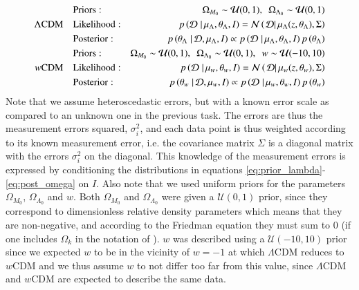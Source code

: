 \documentclass[11pt,a4paper]{article}
\begin{document}
\begin{align}
    \label{eq:prior_lambda}
    &\hspace{10px}                            \text{Priors}:  &\Omega_{M_0} \sim \mathcal{U}(0,1), \hspace{5px} \Omega_{\Lambda_0} \sim \mathcal{U}(0,1) \\
    \label{eq:like_lambda}
    \Lambda\text{CDM}&\hspace{10px}           \text{Likelihood}:  &p\left(\mathcal{D} \left. \right\vert \mu_{\Lambda}, \theta_{\Lambda}, I \right)  = \mathcal{N}\left( \left.\mathcal{D} \right\vert \mu_{\Lambda}(z, \theta_{\Lambda}), \Sigma\right)\\
    \label{eq:post_lambda}
    &\hspace{10px}                            \text{Posterior}: &p\left(\theta_{\Lambda} \left. \right\vert \mathcal{D}, \mu_{\Lambda}, I \right) \propto p\left(\mathcal{D} \left. \right\vert \mu_{\Lambda}, \theta_{\Lambda}, I \right) p\left(\theta_{\Lambda} \right)\\
    \label{eq:prior_omega}
    &\hspace{10px}                            \text{Priors}:  &\Omega_{M_0} \sim \mathcal{U}(0,1), \hspace{5px} \Omega_{\Lambda_0} \sim \mathcal{U}(0,1), \hspace{5px} w \sim \mathcal{U}(-10,10) \\
    \label{eq:like_omega}
    w\text{CDM}& \hspace{10px}                \text{Likelihood}:  &p\left(\mathcal{D} \left. \right\vert \mu_{w}, \theta_{w}, I \right)  = \mathcal{N}\left( \left.\mathcal{D} \right\vert \mu_{w}(z, \theta_{w}), \Sigma\right)\\
    \label{eq:post_omega}
    &\hspace{10px}                            \text{Posterior}: &p\left(\theta_{w} \left. \right\vert \mathcal{D}, \mu_{w}, I \right) \propto p\left(\mathcal{D} \left. \right\vert \mu_{w}, \theta_{w}, I \right) p\left(\theta_{w} \right)
\end{align}
Note that we assume heteroscedastic errors, but with a known error scale as compared to an unknown one in the previous task. The errors are thus the measurement errors squared, $\sigma_i^2$, and each data point is thus weighted according to its known measurement error, i.e. the covariance matrix $\Sigma$ is a diagonal matrix with the errors $\sigma_i^2$ on the diagonal. This knowledge of the measurement errors is expressed by conditioning the distributions in equations \eqref{eq:prior_lambda}-\eqref{eq:post_omega} on $I$. Also note that we used uniform priors for the parameters $\Omega_{M_0}$, $\Omega_{\Lambda_0}$ and $w$. Both $\Omega_{M_0}$ and $\Omega_{\Lambda_0}$ were given a $\mathcal{U}(0,1)$ prior, since they correspond to dimensionless relative density parameters which means that they are non-negative, and according to the Friedman equation they must sum to 0 (if one includes $\Omega_k$ in the notation of \cite{project_pm}). $w$ was described using a $\mathcal{U}(-10,10)$ prior since we expected $w$ to be in the vicinity of $w=-1$ at which $\Lambda$CDM reduces to $w$CDM and we thus assume $w$ to not differ too far from this value, since $\Lambda$CDM and $w$CDM are expected to describe the same data.
\end{document}
